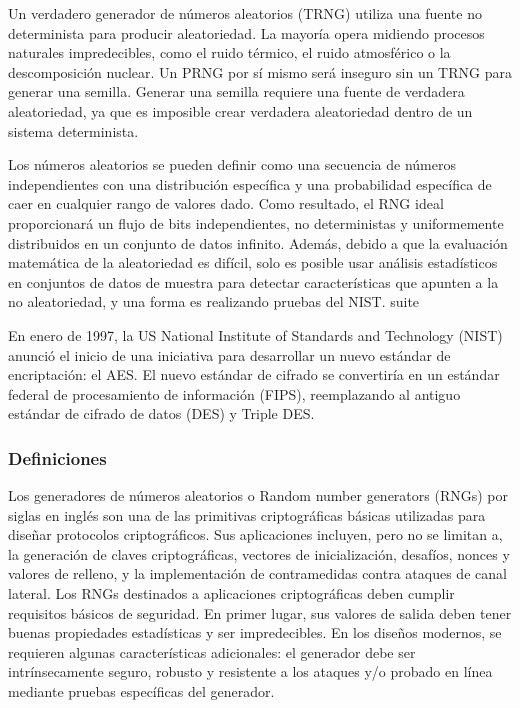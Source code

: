 			
			Un verdadero generador de números aleatorios (TRNG) utiliza una fuente no determinista para producir aleatoriedad. La mayoría opera midiendo procesos naturales impredecibles, como el ruido térmico, el ruido atmosférico o la descomposición nuclear. Un PRNG por sí mismo será inseguro sin un TRNG para generar una semilla. Generar una semilla requiere una fuente de verdadera aleatoriedad, ya que es imposible crear verdadera aleatoriedad dentro de un sistema determinista.\cite{Jun1999}
			
			
			Los números aleatorios se pueden definir como una secuencia de números independientes con una distribución específica y una probabilidad específica de caer en cualquier rango de valores dado. Como resultado, el RNG ideal proporcionará un flujo de bits independientes, no deterministas y uniformemente distribuidos en un conjunto de datos infinito. Además, debido a que la evaluación matemática de la aleatoriedad es difícil, solo es posible usar análisis estadísticos en conjuntos de datos de muestra para detectar características que apunten a la no aleatoriedad, y una forma es realizando pruebas del NIST. suite \cite{Fraga2017}
			
			
			
				



			
			
			En enero de 1997, la US National Institute of Standards and Technology (NIST) anunció el inicio de una iniciativa para desarrollar un nuevo estándar de encriptación: el AES. El nuevo estándar de cifrado se convertiría en un estándar federal de procesamiento de información (FIPS), reemplazando al antiguo estándar de cifrado de datos (DES) y Triple DES. \cite{JoanDaemen2020}
			
		
			\subsubsection{Definiciones}
			
			
			Los generadores de números aleatorios o Random number generators (RNGs) por siglas en inglés son una de las primitivas criptográficas básicas utilizadas para diseñar protocolos criptográficos. Sus aplicaciones incluyen, pero no se limitan a, la generación de claves criptográficas, vectores de inicialización, desafíos, nonces y valores de relleno, y la implementación de contramedidas contra ataques de canal lateral. Los RNGs destinados a aplicaciones criptográficas deben cumplir requisitos básicos de seguridad. En primer lugar, sus valores de salida deben tener buenas propiedades estadísticas y ser impredecibles. En los diseños modernos, se requieren algunas características adicionales: el generador debe ser intrínsecamente seguro, robusto y resistente a los ataques y/o probado en línea mediante pruebas específicas del generador. \cite{Badrignans2011}
			

